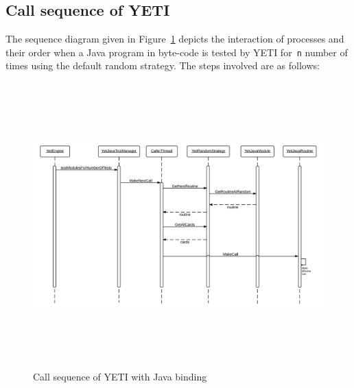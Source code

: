 \subsection{Call sequence of YETI}
The sequence diagram given in Figure~\ref{fig:yetiSequenceDiagram} depicts the interaction of processes and their order when a Java program in byte-code is tested by YETI for~\verb+n+ number of times using the default random strategy.  The steps involved are as follows:

\bigskip
\begin{figure}[H]
	\centering
	\includegraphics[width=15.5cm, height=11cm]{chapter3/sequenceDiagram.png}
	\bigskip
	\caption{Call sequence of YETI with Java binding}
	\label{fig:yetiSequenceDiagram}
\end{figure}
\bigskip

